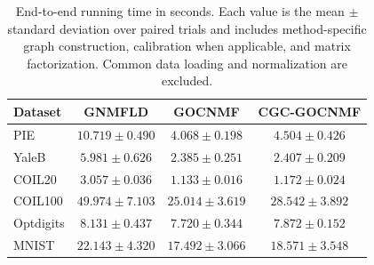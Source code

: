 \begin{table}[t]
\centering
\caption{End-to-end running time in seconds. Each value is the mean $\pm$ standard deviation over paired trials and includes method-specific graph construction, calibration when applicable, and matrix factorization. Common data loading and normalization are excluded.}\label{tab:end_to_end_time}
\setlength{\tabcolsep}{6pt}
\begin{tabular}{lccc}
\toprule
Dataset & GNMFLD & GOCNMF & CGC-GOCNMF \\
\midrule
PIE & $10.719\pm0.490$ & $4.068\pm0.198$ & $4.504\pm0.426$ \\
YaleB & $5.981\pm0.626$ & $2.385\pm0.251$ & $2.407\pm0.209$ \\
COIL20 & $3.057\pm0.036$ & $1.133\pm0.016$ & $1.172\pm0.024$ \\
COIL100 & $49.974\pm7.103$ & $25.014\pm3.619$ & $28.542\pm3.892$ \\
Optdigits & $8.131\pm0.437$ & $7.720\pm0.344$ & $7.872\pm0.152$ \\
MNIST & $22.143\pm4.320$ & $17.492\pm3.066$ & $18.571\pm3.548$ \\
\bottomrule
\end{tabular}
\end{table}
